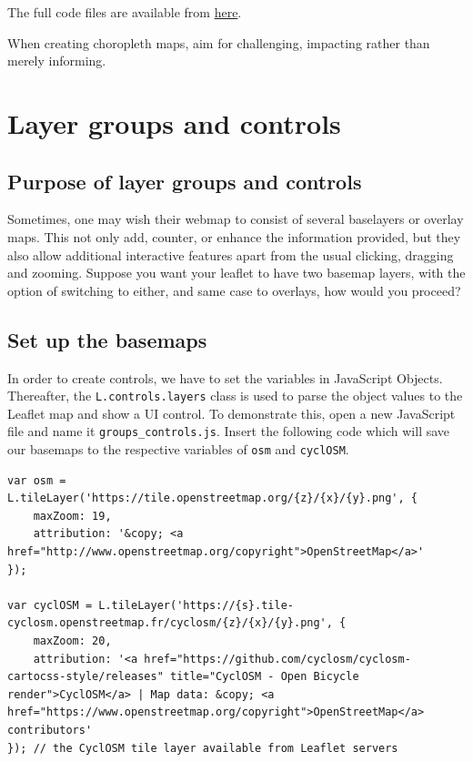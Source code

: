 \documentclass[
]{book}
\begin{document}
The full code files are available from \href{https://www.dropbox.com/scl/fo/d8cwl9t1ay144vvy73pq6/h?dl=0\&rlkey=mardh4rwlqegfvf0vupbj0c28}{here}.

When creating choropleth maps, aim for challenging, impacting rather than merely informing.

\hypertarget{layer-groups-and-controls}{%
\chapter{Layer groups and controls}\label{layer-groups-and-controls}}

\hypertarget{purpose-of-layer-groups-and-controls}{%
\section{Purpose of layer groups and controls}\label{purpose-of-layer-groups-and-controls}}

Sometimes, one may wish their webmap to consist of several baselayers or overlay maps. This not only add, counter, or enhance the information provided, but they also allow additional interactive features apart from the usual clicking, dragging and zooming. Suppose you want your leaflet to have two basemap layers, with the option of switching to either, and same case to overlays, how would you proceed?

\hypertarget{set-up-the-basemaps}{%
\section{Set up the basemaps}\label{set-up-the-basemaps}}

In order to create controls, we have to set the variables in JavaScript Objects. Thereafter, the \texttt{L.controls.layers} class is used to parse the object values to the Leaflet map and show a UI control. To demonstrate this, open a new JavaScript file and name it \texttt{groups\_controls.js}. Insert the following code which will save our basemaps to the respective variables of \texttt{osm} and \texttt{cyclOSM}.

\begin{verbatim}
var osm = L.tileLayer('https://tile.openstreetmap.org/{z}/{x}/{y}.png', {
    maxZoom: 19,
    attribution: '&copy; <a href="http://www.openstreetmap.org/copyright">OpenStreetMap</a>'
});

var cyclOSM = L.tileLayer('https://{s}.tile-cyclosm.openstreetmap.fr/cyclosm/{z}/{x}/{y}.png', {
    maxZoom: 20,
    attribution: '<a href="https://github.com/cyclosm/cyclosm-cartocss-style/releases" title="CyclOSM - Open Bicycle render">CyclOSM</a> | Map data: &copy; <a href="https://www.openstreetmap.org/copyright">OpenStreetMap</a> contributors'
}); // the CyclOSM tile layer available from Leaflet servers
\end{verbatim}
\end{document}
